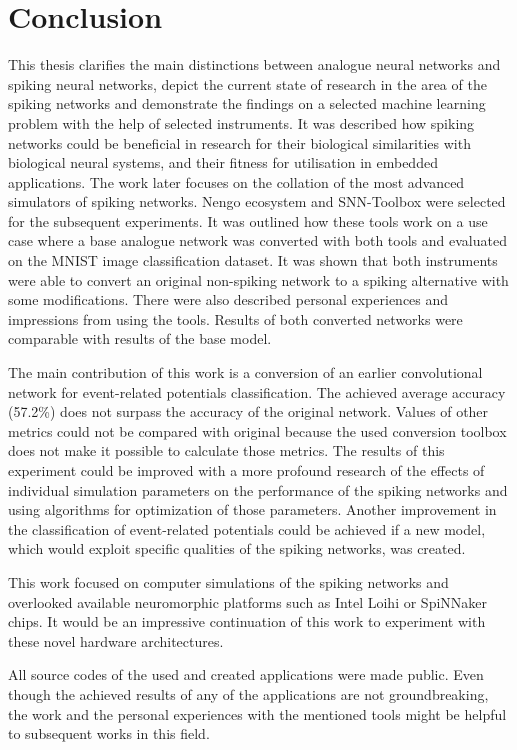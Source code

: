 \chapter{Conclusion} \label{chap:07}

This thesis clarifies the main distinctions between analogue neural networks and spiking neural networks, depict the current state of research in the area of the spiking networks and demonstrate the findings on a selected machine learning problem with the help of selected instruments. It was described how spiking networks could be beneficial in research for their biological similarities with biological neural systems, and their fitness for utilisation in embedded applications. The work later focuses on the collation of the most advanced simulators of spiking networks. Nengo ecosystem and SNN-Toolbox were selected for the subsequent experiments. It was outlined how these tools work on a use case where a base analogue network was converted with both tools and evaluated on the MNIST image classification dataset. It was shown that both instruments were able to convert an original non-spiking network to a spiking alternative with some modifications. There were also described personal experiences and impressions from using the tools. Results of both converted networks were comparable with results of the base model. \par
The main contribution of this work is a conversion of an earlier convolutional network for event-related potentials classification. The achieved average accuracy (57.2\%) does not surpass the accuracy of the original network. Values of other metrics could not be compared with original because the used conversion toolbox does not make it possible to calculate those metrics. The results of this experiment could be improved with a more profound research of the effects of individual simulation parameters on the performance of the spiking networks and using algorithms for optimization of those parameters. Another improvement in the classification of event-related potentials could be achieved if a new model, which would exploit specific qualities of the spiking networks, was created. \par
This work focused on computer simulations of the spiking networks and overlooked available neuromorphic platforms such as Intel Loihi or SpiNNaker chips. It would be an impressive continuation of this work to experiment with these novel hardware architectures. \par
All source codes of the used and created applications were made public\footnotemark. Even though the achieved results of any of the applications are not groundbreaking, the work and the personal experiences with the mentioned tools might be helpful to subsequent works in this field.
